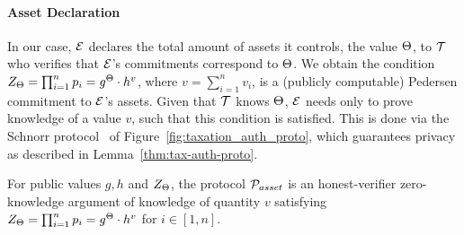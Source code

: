 \paragraph{Asset Declaration}\label{subsec:tax-authority-proto}
In our case, $\mathcal{E}$ declares the total amount of assets
it controls, \ie the value $\Theta$,
to  $\mathcal{T}$ who verifies  that $\mathcal{E}$'s commitments
correspond to $\Theta$. We obtain the condition
$Z_\Theta = \prod_{i = 1}^n p_i = g^{\Theta} \cdot h^v$,
where $v = {\sum_{i = 1}^n v_i}$, is a (publicly
computable) Pedersen commitment to $\mathcal{E}$'s assets. Given that $\mathcal{T}$
knows $\Theta$, $\mathcal{E}$ needs only to prove knowledge of a value $v$, such
that this condition is satisfied. This is done via the Schnorr
protocol~\cite{C:Schnorr89} of Figure~\ref{fig:taxation_auth_proto}, which
guarantees privacy as described in Lemma~\ref{thm:tax-auth-proto}.



\begin{lemma}\label{thm:tax-auth-proto}
    For public values $g, h$ and $Z_\Theta$, the protocol $\mathcal{P}_{asset}$ is an
    honest-verifier zero-knowledge argument of knowledge of quantity $v$
    satisfying
    $Z_\Theta = \prod_{i = 1}^n p_i = g^{\Theta} \cdot h^v$ for $i \in [1, n]$.
\end{lemma}

